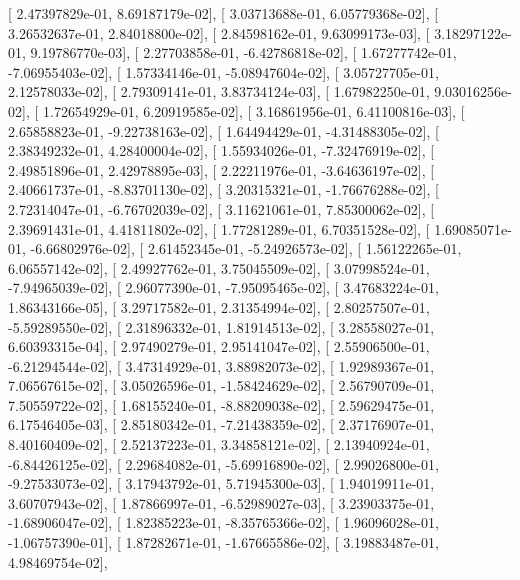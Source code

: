 \documentclass{article}
\begin{document}
       [  2.47397829e-01,   8.69187179e-02],
       [  3.03713688e-01,   6.05779368e-02],
       [  3.26532637e-01,   2.84018800e-02],
       [  2.84598162e-01,   9.63099173e-03],
       [  3.18297122e-01,   9.19786770e-03],
       [  2.27703858e-01,  -6.42786818e-02],
       [  1.67277742e-01,  -7.06955403e-02],
       [  1.57334146e-01,  -5.08947604e-02],
       [  3.05727705e-01,   2.12578033e-02],
       [  2.79309141e-01,   3.83734124e-03],
       [  1.67982250e-01,   9.03016256e-02],
       [  1.72654929e-01,   6.20919585e-02],
       [  3.16861956e-01,   6.41100816e-03],
       [  2.65858823e-01,  -9.22738163e-02],
       [  1.64494429e-01,  -4.31488305e-02],
       [  2.38349232e-01,   4.28400004e-02],
       [  1.55934026e-01,  -7.32476919e-02],
       [  2.49851896e-01,   2.42978895e-03],
       [  2.22211976e-01,  -3.64636197e-02],
       [  2.40661737e-01,  -8.83701130e-02],
       [  3.20315321e-01,  -1.76676288e-02],
       [  2.72314047e-01,  -6.76702039e-02],
       [  3.11621061e-01,   7.85300062e-02],
       [  2.39691431e-01,   4.41811802e-02],
       [  1.77281289e-01,   6.70351528e-02],
       [  1.69085071e-01,  -6.66802976e-02],
       [  2.61452345e-01,  -5.24926573e-02],
       [  1.56122265e-01,   6.06557142e-02],
       [  2.49927762e-01,   3.75045509e-02],
       [  3.07998524e-01,  -7.94965039e-02],
       [  2.96077390e-01,  -7.95095465e-02],
       [  3.47683224e-01,   1.86343166e-05],
       [  3.29717582e-01,   2.31354994e-02],
       [  2.80257507e-01,  -5.59289550e-02],
       [  2.31896332e-01,   1.81914513e-02],
       [  3.28558027e-01,   6.60393315e-04],
       [  2.97490279e-01,   2.95141047e-02],
       [  2.55906500e-01,  -6.21294544e-02],
       [  3.47314929e-01,   3.88982073e-02],
       [  1.92989367e-01,   7.06567615e-02],
       [  3.05026596e-01,  -1.58424629e-02],
       [  2.56790709e-01,   7.50559722e-02],
       [  1.68155240e-01,  -8.88209038e-02],
       [  2.59629475e-01,   6.17546405e-03],
       [  2.85180342e-01,  -7.21438359e-02],
       [  2.37176907e-01,   8.40160409e-02],
       [  2.52137223e-01,   3.34858121e-02],
       [  2.13940924e-01,  -6.84426125e-02],
       [  2.29684082e-01,  -5.69916890e-02],
       [  2.99026800e-01,  -9.27533073e-02],
       [  3.17943792e-01,   5.71945300e-03],
       [  1.94019911e-01,   3.60707943e-02],
       [  1.87866997e-01,  -6.52989027e-03],
       [  3.23903375e-01,  -1.68906047e-02],
       [  1.82385223e-01,  -8.35765366e-02],
       [  1.96096028e-01,  -1.06757390e-01],
       [  1.87282671e-01,  -1.67665586e-02],
       [  3.19883487e-01,   4.98469754e-02],
\end{document}
